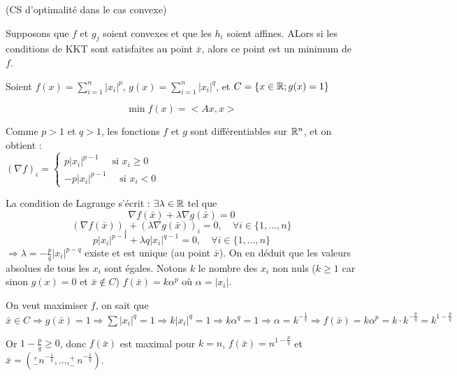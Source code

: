 \begin{theoreme} (CS d'optimalité dans le cas convexe)

Supposons que $f$ et $g_j$ soient convexes et que les $h_i$ soient affines. ALors si les conditions de KKT sont satisfaites au point $\bar{x}$, alors ce point est un minimum de $f$.
\end{theoreme}
\begin{exemple} %

	Soient $ \displaystyle f(x) = \sum_{i=1}^n |x_i|^p $, 
	$ \displaystyle g(x) = \sum_{i=1}^n |x_i|^q $, et
	$ \displaystyle C = \{ x \in \mathbb{R} ; g(x) = 1 \} $
	
	\[ \min f(x)=<Ax,x> \]
	
	Comme $p>1$ et $q>1$, les fonctions $f$ et $g$ sont différentiables sur $\mathbb{R}^n$, et on obtient :\\ $\displaystyle (\nabla f)_i = \begin{cases} p |x_i|^{p-1} \quad \text{ si }x_i\geq 0 \\  -p |x_i|^{p-1} \quad \text{ si } x_i < 0  \end{cases}$ 
	
	La condition de Lagrange s'écrit : $\exists \lambda \in \mathbb{R}$ tel que 
	\[ \nabla f(\bar{x}) + \lambda \nabla g(\bar{x}) = 0 \]
	\[ (\nabla f(\bar{x}))_i + (\lambda \nabla g(\bar{x}))_i = 0 , \quad \forall i \in \{ 1, \dots, n \} \]
	\[ p|x_i|^{p-1} + \lambda q|x_i|^{q-1} = 0 , \quad \forall i \in \{ 1, \dots, n \} \]
	$ \Rightarrow \lambda = - \frac{p}{q}|x_i|^{p-q} $ existe et est unique (au point $\bar{x}$). On en déduit que les valeurs absolues de tous les $x_i$ sont égales.
	Notons $k$ le nombre des $x_i$ non nuls ($k \geq 1$ car sinon $g(x) = 0$ et $\bar{x} \not \in C$)
	$f(\bar{x}) = k \alpha ^p$ où $\alpha = |x_i|$.
	
	On veut maximiser $f$, on sait que $\bar{x} \in C \Rightarrow g(\bar{x}) = 1 \Rightarrow \sum |x_i|^q = 1 \Rightarrow k |x_i|^q = 1 \Rightarrow k \alpha^q = 1 \Rightarrow \alpha = k^{-\frac{1}{q}} \Rightarrow f(\bar{x}) = k \alpha^p = k \cdot k^{-\frac{p}{q}} = k^{1-\frac{p}{q}} $
	
	Or $1-\frac{p}{q} \geq 0$, donc $f(\bar{x})$ est maximal pour $k=n$, $f(\bar{x}) = n^{1-\frac{p}{q}}$ et $\bar{x} = (^+_- n^{-\frac{1}{q}}, \dots, ^+_- n^{-\frac{1}{q}})$.
	
\end{exemple}

